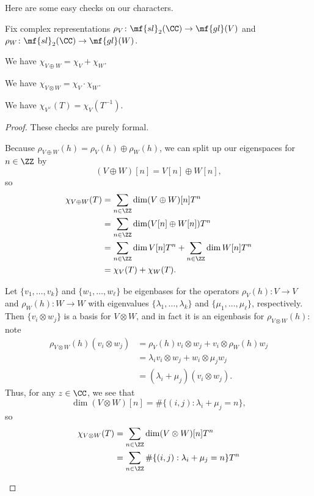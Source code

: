\documentclass[../notes.tex]{subfiles}
\begin{document}
Here are some easy checks on our characters.
\begin{lemma} \label{lem:sl2-decompose-char}
	Fix complex representations $\rho_V\colon\mf{sl}_2(\CC)\to\mf{gl}(V)$ and $\rho_W\colon\mf{sl}_2(\CC)\to\mf{gl}(W)$.
	\begin{listalph}
		\item We have $\chi_{V\oplus W}=\chi_V+\chi_W$.
		\item We have $\chi_{V\otimes W}=\chi_V\cdot\chi_W$.
		\item We have $\chi_{V^\lor}(T)=\chi_V\left(T^{-1}\right)$.
	\end{listalph}
\end{lemma}
\begin{proof}
	These checks are purely formal.
	\begin{listalph}
		\item Because $\rho_{V\oplus W}(h)=\rho_V(h)\oplus\rho_W(h)$, we can split up our eigenspaces for $n\in\ZZ$ by
		\[(V\oplus W)[n]=V[n]\oplus W[n],\]
		so
		\begin{align*}
			\chi_{V\oplus W}(T) &= \sum_{n\in\ZZ}\dim(V\oplus W)[n]T^n \\
			&= \sum_{n\in\ZZ}\dim(V[n]\oplus W[n])T^n \\
			&= \sum_{n\in\ZZ}\dim V[n]T^n+\sum_{n\in\ZZ}\dim W[n]T^n \\
			&= \chi_V(T)+\chi_W(T).
		\end{align*}
		\item Let $\{v_1,\ldots,v_k\}$ and $\{w_1,\ldots,w_\ell\}$ be eigenbases for the operators $\rho_V(h)\colon V\to V$ and $\rho_W(h)\colon W\to W$ with eigenvalues $\{\lambda_1,\ldots,\lambda_k\}$ and $\{\mu_1,\ldots,\mu_\ell\}$, respectively. Then $\{v_i\otimes w_j\}$ is a basis for $V\otimes W$, and in fact it is an eigenbasis for $\rho_{V\otimes W}(h)$: note
		\begin{align*}
			\rho_{V\otimes W}(h)(v_i\otimes w_j) &= \rho_V(h)v_i\otimes w_j+v_i\otimes\rho_W(h)w_j \\
			&= \lambda_iv_i\otimes w_j+w_i\otimes\mu_jw_j \\
			&= (\lambda_i+\mu_j)(v_i\otimes w_j).
		\end{align*}
		Thus, for any $z\in\CC$, we see that
		\[\dim(V\otimes W)[n]=\#\{(i,j):\lambda_i+\mu_j=n\},\]
		so
		\begin{align*}
			\chi_{V\otimes W}(T) &= \sum_{n\in\ZZ}\dim(V\otimes W)[n]T^n \\
			&= \sum_{n\in\ZZ}\#\{(i,j):\lambda_i+\mu_j=n\}T^n \\

\end{align*}
\end{listalph}
\end{proof}
\end{document}

